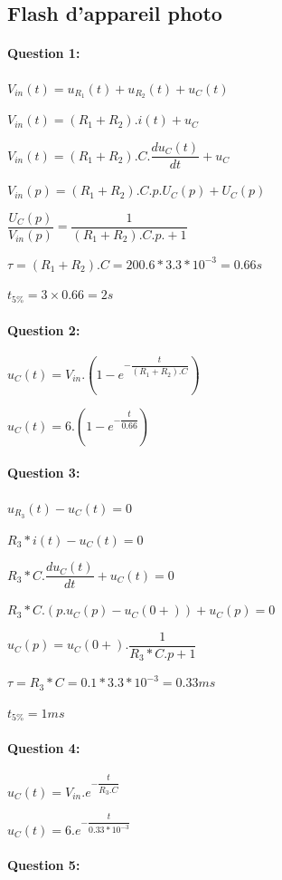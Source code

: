 \subsection{Flash d'appareil photo}

\paragraph{Question 1:}

$V_{in}(t)=u_{R_1}(t)+u_{R_2}(t)+u_C(t)$

$V_{in}(t)=(R_1+R_2).i(t)+u_C$

$V_{in}(t)=(R_1+R_2).C.\dfrac{du_C(t)}{dt}+u_C$

$V_{in}(p)=(R_1+R_2).C.p.U_C(p)+U_C(p)$

$\dfrac{U_C(p)}{V_{in}(p)}=\dfrac{1}{(R_1+R_2).C.p.+1}$

$\tau=(R_1+R_2).C=200.6*3.3*10^{-3}=0.66s$

$t_{5\%}=3\times 0.66=2s$

\paragraph{Question 2:}

$u_C(t)=V_{in}.\left(1-e^{-\dfrac{t}{(R_1+R_2).C}}\right)$

$u_C(t)=6.\left(1-e^{-\dfrac{t}{0.66}}\right)$

\paragraph{Question 3:}

$u_{R_3}(t)-u_C(t)=0$

$R_3*i(t)-u_C(t)=0$

$R_3*C.\dfrac{du_C(t)}{dt}+u_C(t)=0$

$R_3*C.(p.u_C(p)-u_C(0+))+u_C(p)=0$

$u_C(p)=u_C(0+).\dfrac{1}{R_3*C.p+1}$

$\tau=R_3*C=0.1*3.3*10^{-3}=0.33ms$

$t_{5\%}=1ms$

\paragraph{Question 4:}

$u_C(t)=V_{in}.e^{-\dfrac{t}{R_3.C}}$

$u_C(t)=6.e^{-\dfrac{t}{0.33*10^{-3}}}$

\paragraph{Question 5:}

